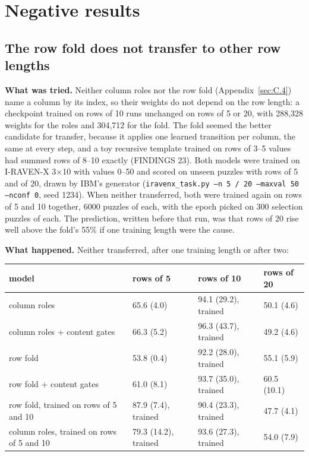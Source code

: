 \chapter{Negative results}\label{app:E}

\section{The row fold does not transfer to other row lengths}\label{sec:E.1}

\textbf{What was tried.} Neither column roles nor the row fold (Appendix~\ref{sec:C.4}) name a column by its index, so their weights do not depend on the row length: a checkpoint trained on rows of 10 runs unchanged on rows of 5 or 20, with 288,328 weights for the roles and 304,712 for the fold. The fold seemed the better candidate for transfer, because it applies one learned transition per column, the same at every step, and a toy recursive template trained on rows of 3–5 values had summed rows of 8–10 exactly (FINDINGS 23). Both models were trained on I-RAVEN-X 3×10 with values 0–50 and scored on unseen puzzles with rows of 5 and of 20, drawn by IBM's generator (\texttt{iravenx\_task.py --n 5 / 20 --maxval 50 --nconf 0}, seed 1234). When neither transferred, both were trained again on rows of 5 and 10 together, 6000 puzzles of each, with the epoch picked on 300 selection puzzles of each. The prediction, written before that run, was that rows of 20 rise well above the fold's 55\% if one training length were the cause.

\textbf{What happened.} Neither transferred, after one training length or after two:

\begin{center}\small
\begin{tabularx}{\linewidth}{@{}YYYl@{}}
\toprule
model & rows of 5 & rows of 10 & rows of 20 \\
\midrule
column roles & 65.6 (4.0) & 94.1 (29.2), trained & 50.1 (4.6) \\
column roles + content gates & 66.3 (5.2) & 96.3 (43.7), trained & 49.2 (4.6) \\
row fold & 53.8 (0.4) & 92.2 (28.0), trained & 55.1 (5.9) \\
row fold + content gates & 61.0 (8.1) & 93.7 (35.0), trained & 60.5 (10.1) \\
row fold, trained on rows of 5 and 10 & 87.9 (7.4), trained & 90.4 (23.3), trained & 47.7 (4.1) \\
column roles, trained on rows of 5 and 10 & 79.3 (14.2), trained & 93.6 (27.3), trained & 54.0 (7.9) \\
\bottomrule
\end{tabularx}
\end{center}

